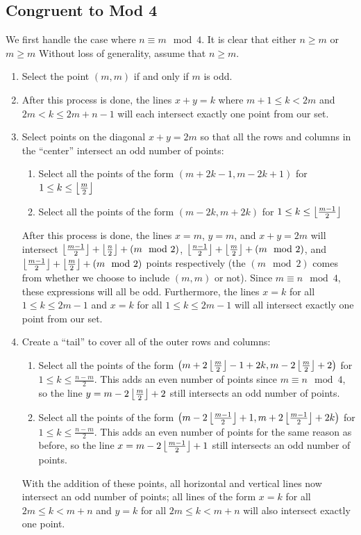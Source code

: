 \documentclass[10pt]{../usamts}
\begin{document}
\begin{solution}
\section*{Congruent to Mod 4}
We first handle the case where $n \equiv m \mod 4$. It is clear that either $n \geq m$ or $m \geq m$ Without loss of generality, assume that $n \geq m$.
\begin{enumerate}
    \item Select the point $(m,m)$ if and only if $m$ is odd.
    \item \mainaxis
    After this process is done, the lines $x+y = k$ where $m+1 \leq k < 2m$ and $2m < k \leq 2m+n-1$ will each intersect exactly one point from our set.
    \item Select points on the diagonal $x+y = 2m$ so that all the rows and columns in the ``center'' intersect an odd number of points:
    \begin{enumerate}
        \item Select all the points of the form $(m+2k-1,m-2k+1)$ for $1 \leq k \leq \left\lfloor \frac{m}{2} \right\rfloor$
        \item Select all the points of the form $(m-2k,m+2k)$ for $1 \leq k \leq \left\lfloor \frac{m-1}{2} \right\rfloor$
    \end{enumerate}
    After this process is done, the lines $x=m$, $y=m$, and $x+y = 2m$ will intersect $\left\lfloor \frac{m-1}{2} \right\rfloor + \left\lfloor \frac{n}{2} \right\rfloor + (m \mod 2)$, $\left\lfloor \frac{n-1}{2} \right\rfloor + \left\lfloor \frac{m}{2} \right\rfloor + (m \mod 2)$, and $\left\lfloor \frac{m-1}{2} \right\rfloor + \left\lfloor \frac{m}{2} \right\rfloor + (m \mod 2)$ points respectively (the $(m \mod 2)$ comes from whether we choose to include $(m,m)$ or not). Since $m \equiv n \mod 4$, these expressions will all be odd. Furthermore, the lines $x=k$ for all $1 \leq k \leq 2m-1$ and $x=k$ for all $1 \leq k \leq 2m-1$ will all intersect exactly one point from our set.
    \item Create a ``tail'' to cover all of the outer rows and columns:
    \begin{enumerate}
        \item Select all the points of the form $\left(  m+2\left\lfloor \frac{m}{2} \right\rfloor-1+2k, m-2\left\lfloor \frac{m}{2} \right\rfloor+2  \right)$ for $1 \leq k \leq \frac{n-m}{2}$. This adds an even number of points since $m \equiv n \mod 4$, so the line $y = m-2\left\lfloor \frac{m}{2} \right\rfloor+2$ still intersects an odd number of points.
        \item Select all the points of the form $\left(  m-2\left\lfloor \frac{m-1}{2} \right\rfloor+1, m+2\left\lfloor \frac{m-1}{2} \right\rfloor+2k  \right)$ for $1 \leq k \leq \frac{n-m}{2}$. This adds an even number of points for the same reason as before, so the line $x = m-2\left\lfloor \frac{m-1}{2} \right\rfloor+1$ still intersects an odd number of points.
    \end{enumerate}
    With the addition of these points, all horizontal and vertical lines now intersect an odd number of points; all lines of the form $x = k$ for all $2m \leq k < m+n$ and $y=k$ for all $2m \leq k < m+n$ will also intersect exactly one point.
    

\end{enumerate}
\end{solution}
\end{document}
